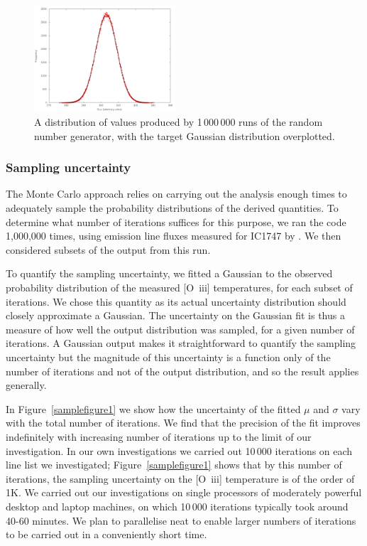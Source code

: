 \documentclass[useAMS,usenatbib]{mn2e}
\begin{document}
\begin{figure}
\includegraphics[width=0.47\textwidth]{figures/gaussian_test.png}
\caption{A distribution of values produced by 1\,000\,000 runs of the random number generator, with the target Gaussian distribution overplotted.}
\label{gaussiantest}
\end{figure}

\subsubsection{Sampling uncertainty}

The Monte Carlo approach relies on carrying out the analysis enough times to adequately sample the probability distributions of the derived quantities.  To determine what number of iterations suffices for this purpose, we ran the code 1,000,000 times, using emission line fluxes measured for IC1747 by \citet{2005MNRAS.362..424W}.  We then considered subsets of the output from this run.

To quantify the sampling uncertainty, we fitted a Gaussian to the observed probability distribution of the measured [O~{\sc iii}] temperatures, for each subset of iterations.  We chose this quantity as its actual uncertainty distribution should closely approximate a Gaussian.  The uncertainty on the Gaussian fit is thus a measure of how well the output distribution was sampled, for a given number of iterations.  A Gaussian output makes it straightforward to quantify the sampling uncertainty but the magnitude of this uncertainty is a function only of the number of iterations and not of the output distribution, and so the result applies generally.

In Figure~\ref{samplefigure1} we show how the uncertainty of the fitted $\mu$ and $\sigma$ vary with the total number of iterations.  We find that the precision of the fit improves indefinitely with increasing number of iterations up to the limit of our investigation.  In our own investigations we carried out 10\,000 iterations on each line list we investigated; Figure~\ref{samplefigure1} shows that by this number of iterations, the sampling uncertainty on the [O~{\sc iii}] temperature is of the order of 1K.  We carried out our investigations on single processors of moderately powerful desktop and laptop machines, on which 10\,000 iterations typically took around 40-60 minutes.  We plan to parallelise {\sc neat} to enable larger numbers of iterations to be carried out in a conveniently short time.
\end{document}
